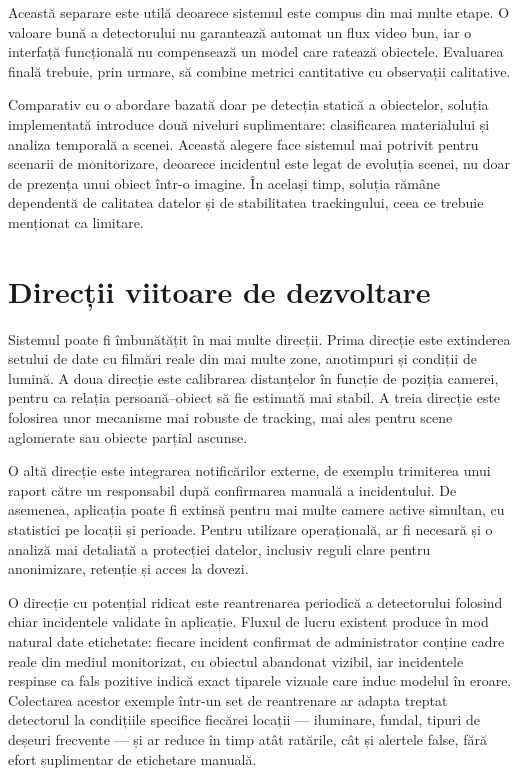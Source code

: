 Această separare este utilă deoarece sistemul este compus din mai multe etape. O valoare bună a detectorului nu garantează automat un flux video bun, iar o interfață funcțională nu compensează un model care ratează obiectele. Evaluarea finală trebuie, prin urmare, să combine metrici cantitative cu observații calitative.

Comparativ cu o abordare bazată doar pe detecția statică a obiectelor, soluția implementată introduce două niveluri suplimentare: clasificarea materialului și analiza temporală a scenei. Această alegere face sistemul mai potrivit pentru scenarii de monitorizare, deoarece incidentul este legat de evoluția scenei, nu doar de prezența unui obiect într-o imagine. În același timp, soluția rămâne dependentă de calitatea datelor și de stabilitatea trackingului, ceea ce trebuie menționat ca limitare.

\section{Direcții viitoare de dezvoltare}

Sistemul poate fi îmbunătățit în mai multe direcții. Prima direcție este extinderea setului de date cu filmări reale din mai multe zone, anotimpuri și condiții de lumină. A doua direcție este calibrarea distanțelor în funcție de poziția camerei, pentru ca relația persoană--obiect să fie estimată mai stabil. A treia direcție este folosirea unor mecanisme mai robuste de tracking, mai ales pentru scene aglomerate sau obiecte parțial ascunse.

O altă direcție este integrarea notificărilor externe, de exemplu trimiterea unui raport către un responsabil după confirmarea manuală a incidentului. De asemenea, aplicația poate fi extinsă pentru mai multe camere active simultan, cu statistici pe locații și perioade. Pentru utilizare operațională, ar fi necesară și o analiză mai detaliată a protecției datelor, inclusiv reguli clare pentru anonimizare, retenție și acces la dovezi.

O direcție cu potențial ridicat este reantrenarea periodică a detectorului folosind chiar incidentele validate în aplicație. Fluxul de lucru existent produce în mod natural date etichetate: fiecare incident confirmat de administrator conține cadre reale din mediul monitorizat, cu obiectul abandonat vizibil, iar incidentele respinse ca fals pozitive indică exact tiparele vizuale care induc modelul în eroare. Colectarea acestor exemple într-un set de reantrenare ar adapta treptat detectorul la condițiile specifice fiecărei locații --- iluminare, fundal, tipuri de deșeuri frecvente --- și ar reduce în timp atât ratările, cât și alertele false, fără efort suplimentar de etichetare manuală.

